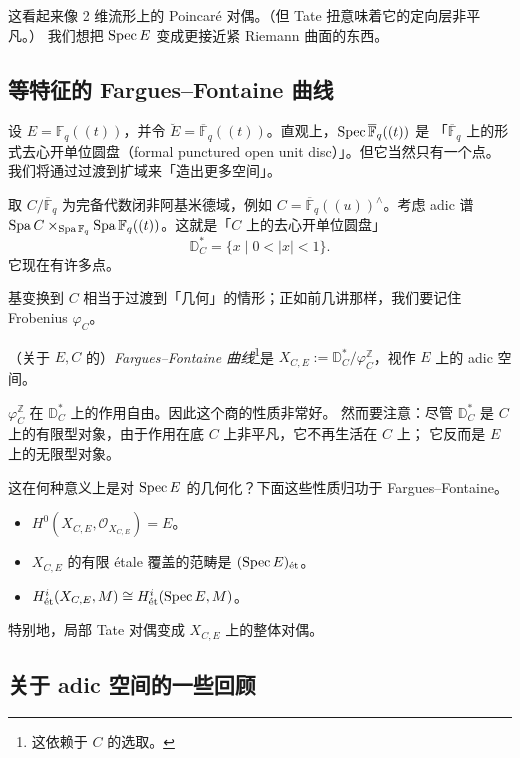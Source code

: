 这看起来像 2 维流形上的 Poincaré 对偶。（但 Tate 扭意味着它的定向层非平凡。）
我们想把 $\Spec E$ 变成更接近紧 Riemann 曲面的东西。

\subsection{等特征的 Fargues--Fontaine 曲线}

设 $E=\mathbb{F}_q((t))$，并令 $\breve E=\overline{\mathbb{F}}_q((t))$。直观上，$\Spec\overline{\mathbb{F}}_q((t))$ 是
「$\overline{\mathbb{F}}_q$ 上的形式去心开单位圆盘（formal punctured open unit disc）」。但它当然只有一个点。
我们将通过过渡到扩域来「造出更多空间」。

取 $C/\overline{\mathbb{F}}_q$ 为完备代数闭非阿基米德域，例如 $C=\overline{\mathbb{F}}_q((u))^\wedge$。考虑 adic 谱
$\Spa C\times_{\Spa\mathbb{F}_q}\Spa\mathbb{F}_q((t))$。这就是「$C$ 上的去心开单位圆盘」
\[
\mathbb{D}^*_C=\{x\mid 0<|x|<1\}.
\]
它现在有许多点。

基变换到 $C$ 相当于过渡到「几何」的情形；正如前几讲那样，我们要记住 Frobenius $\varphi_C$。

\begin{definition}
（关于 $E,C$ 的）\emph{Fargues--Fontaine 曲线}\footnote{这依赖于 $C$ 的选取。}是
$X_{C,E}:=\mathbb{D}^*_C/\varphi_C^{\mathbb{Z}}$，视作 $E$ 上的 adic 空间。
\end{definition}


\begin{remark}
$\varphi_C^{\mathbb{Z}}$ 在 $\mathbb{D}^*_C$ 上的作用自由。因此这个商的性质非常好。
然而要注意：尽管 $\mathbb{D}^*_C$ 是 $C$ 上的有限型对象，由于作用在底 $C$ 上非平凡，它不再生活在 $C$ 上；
它反而是 $E$ 上的无限型对象。
\end{remark}

这在何种意义上是对 $\Spec E$ 的几何化？下面这些性质归功于 Fargues--Fontaine。
\begin{itemize}
  \item $H^0(X_{C,E},\mathcal{O}_{X_{C,E}})=E$。
  \item $X_{C,E}$ 的有限 étale 覆盖的范畴是 $(\Spec E)_{\et}$。
  \item $H^i_{\et}(X_{C,E},M)\cong H^i_{\et}(\Spec E,M)$。
\end{itemize}
特别地，局部 Tate 对偶变成 $X_{C,E}$ 上的整体对偶。

\subsection{关于 adic 空间的一些回顾}

